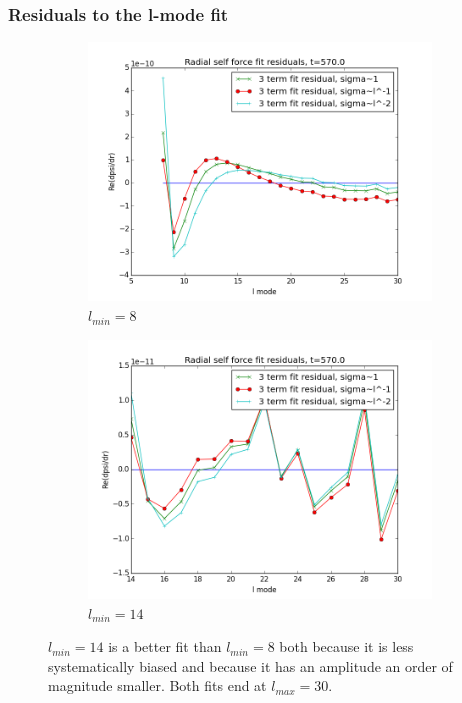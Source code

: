 \documentclass{beamer}
\begin{document}
\begin{frame}
  \frametitle{Residuals to the l-mode fit}
  \begin{figure}
    \centering
    \begin{subfigure}{.45\textwidth}
      \centering
      \includegraphics[width=\textwidth]{fitresiduals3terms570l8}
      \caption{$l_{min}=8$}
    \end{subfigure}
    \begin{subfigure}{.45\textwidth}
      \centering
      \includegraphics[width=\textwidth]{fitresidulas3terms570l14}
      \caption{$l_{min}=14$}
    \end{subfigure}
  \caption{$l_{min}=14$ is a better fit than $l_{min}=8$ both because it is less systematically biased and because it has an amplitude an order of magnitude smaller. Both fits end at $l_{max}=30$.}
  \end{figure}
\end{frame}
\end{document}
